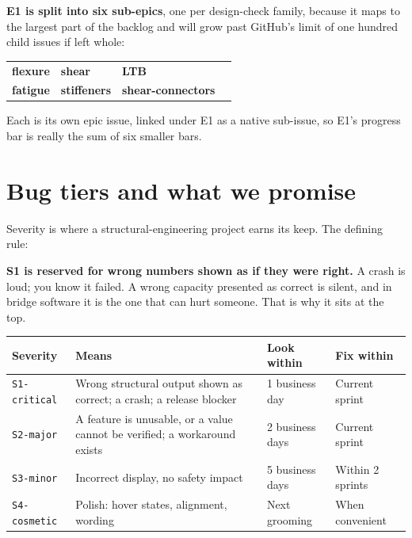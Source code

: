 \documentclass[11pt,a4paper]{report}
\newcommand{\code}[1]{\texttt{#1}}
\begin{document}
\textbf{E1 is split into six sub-epics}, one per design-check family, because it
maps to the largest part of the backlog and will grow past GitHub's limit of one
hundred child issues if left whole:

\begin{center}
\begin{tabular}{@{}llll@{}}
\toprule
\textbf{flexure} & \textbf{shear} & \textbf{LTB} & \\
\textbf{fatigue} & \textbf{stiffeners} & \textbf{shear-connectors} & \\
\bottomrule
\end{tabular}
\end{center}

Each is its own epic issue, linked under E1 as a native sub-issue, so E1's progress
bar is really the sum of six smaller bars.

\chapter{Bug tiers and what we promise}

Severity is where a structural-engineering project earns its keep. The defining
rule:

\begin{gotcha}
\textbf{S1 is reserved for wrong numbers shown as if they were right.} A crash is
loud; you know it failed. A wrong capacity presented as correct is silent, and in
bridge software it is the one that can hurt someone. That is why it sits at the top.
\end{gotcha}

\begin{center}
\begin{longtable}{@{}p{2.2cm}p{5.4cm}p{2.0cm}p{2.4cm}@{}}
\toprule
\textbf{Severity} & \textbf{Means} & \textbf{Look within} & \textbf{Fix within} \\
\midrule
\endhead
\code{S1-critical} & Wrong structural output shown as correct; a crash; a release blocker & 1 business day & Current sprint \\
\code{S2-major}    & A feature is unusable, or a value cannot be verified; a workaround exists & 2 business days & Current sprint \\
\code{S3-minor}    & Incorrect display, no safety impact & 5 business days & Within 2 sprints \\
\code{S4-cosmetic} & Polish: hover states, alignment, wording & Next grooming & When convenient \\
\bottomrule
\end{longtable}
\end{center}
\end{document}
